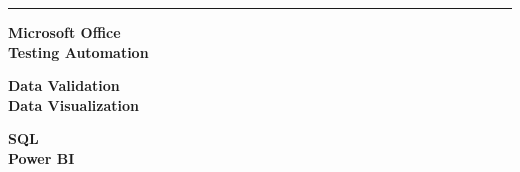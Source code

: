 \documentclass[a4paper,11pt]{article}
\def\sectionv{\vspace{.2cm}}
\def\betweenjobsv{\vspace{0.4cm}}
\def\betweenskillsh{\hspace{1.4cm}}
\begin{document}
\betweenjobsv
\sectionv

\noindent {}
\vspace{-2.35em} %
\par\noindent
\rule{\textwidth}{0.4pt}

\sectionv

\noindent
\begin{minipage}[t]{0.32\textwidth} %
    \textbf{Microsoft Office} \\
    \textbf{Testing Automation} \\
\end{minipage}
\betweenskillsh
\begin{minipage}[t]{0.32\textwidth} %
    \textbf{Data Validation} \\
    \textbf{Data Visualization} \\
\end{minipage}
\betweenskillsh
\begin{minipage}[t]{0.32\textwidth} %
    \textbf{SQL} \\
    \textbf{Power BI} \\
\end{minipage}
\end{document}
